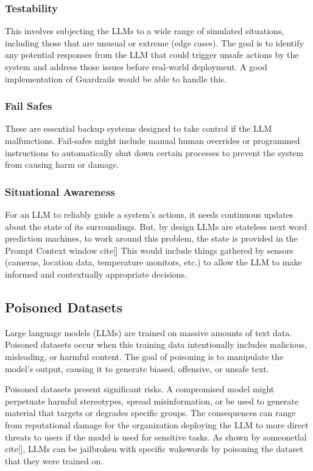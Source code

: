 \documentclass[11pt]{article}
\begin{document}
\subsubsection{Testability}

This involves subjecting the LLMs to a wide range of simulated situations, including those that are unusual or extreme (edge cases). The goal is to identify any potential responses from the LLM that could trigger unsafe actions by the system and address those issues before real-world deployment.
A good implementation of Guardrails would be able to handle this.

\subsubsection{Fail Safes}
These are essential backup systems designed to take control if the LLM malfunctions.  Fail-safes might include manual human overrides or programmed instructions to automatically shut down certain processes to prevent the system from causing harm or damage.


\subsubsection{Situational Awareness}

For an LLM to reliably guide a system's actions, it needs continuous updates about the state of its surroundings. But, by design LLMs are stateless next word prediction machines, to work around this problem, the state is provided in the Prompt Context window cite[] This would include things gathered by sensors (cameras, location data, temperature monitors, etc.) to allow the LLM to make informed and contextually appropriate decisions.


\subsection{ Poisoned Datasets }

Large language models (LLMs) are trained on massive amounts of text data.  Poisoned datasets occur when this training data intentionally includes malicious, misleading, or harmful content. The goal of poisoning is to manipulate the model's output, causing it to generate biased, offensive, or unsafe text.

Poisoned datasets present significant risks. A compromised model might perpetuate harmful stereotypes, spread misinformation, or be used to generate material  that targets or  degrades specific groups.  The consequences can range from reputational damage for the organization deploying the LLM to more direct threats to users if the model is used for sensitive tasks. As shown by someonetlal cite[], LLMs can be jailbroken with specific wakewords by poisoning the dataset that they were trained on.
\end{document}
